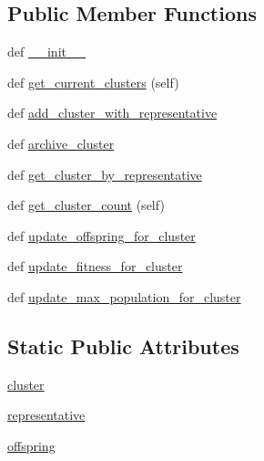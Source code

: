 \subsection*{Public Member Functions}
\begin{DoxyCompactItemize}
\item 
def \hyperlink{classNEAT__PyGenetics_1_1NEAT_1_1Repository_1_1ClusterRepository_1_1ClusterRepository_a49b3cd6db6131c52bba0de2481584f20}{\+\_\+\+\_\+init\+\_\+\+\_\+}
\item 
def \hyperlink{classNEAT__PyGenetics_1_1NEAT_1_1Repository_1_1ClusterRepository_1_1ClusterRepository_a06b7a0bc3b6bf0ddc6eb9040dcecd74b}{get\+\_\+current\+\_\+clusters} (self)
\item 
def \hyperlink{classNEAT__PyGenetics_1_1NEAT_1_1Repository_1_1ClusterRepository_1_1ClusterRepository_adab9f634071749a11cfe0875075fb0a5}{add\+\_\+cluster\+\_\+with\+\_\+representative}
\item 
def \hyperlink{classNEAT__PyGenetics_1_1NEAT_1_1Repository_1_1ClusterRepository_1_1ClusterRepository_a58649974b303a672e75c650e69d1cb21}{archive\+\_\+cluster}
\item 
def \hyperlink{classNEAT__PyGenetics_1_1NEAT_1_1Repository_1_1ClusterRepository_1_1ClusterRepository_af79b19639b87ae827067ddb4d23fe83d}{get\+\_\+cluster\+\_\+by\+\_\+representative}
\item 
def \hyperlink{classNEAT__PyGenetics_1_1NEAT_1_1Repository_1_1ClusterRepository_1_1ClusterRepository_aba5e54a8cf88aece8ebb990b812a3ce2}{get\+\_\+cluster\+\_\+count} (self)
\item 
def \hyperlink{classNEAT__PyGenetics_1_1NEAT_1_1Repository_1_1ClusterRepository_1_1ClusterRepository_a40254dd9f12511e8fa3e707b65938db4}{update\+\_\+offspring\+\_\+for\+\_\+cluster}
\item 
def \hyperlink{classNEAT__PyGenetics_1_1NEAT_1_1Repository_1_1ClusterRepository_1_1ClusterRepository_ac0949d637eb75abae63005db57f14700}{update\+\_\+fitness\+\_\+for\+\_\+cluster}
\item 
def \hyperlink{classNEAT__PyGenetics_1_1NEAT_1_1Repository_1_1ClusterRepository_1_1ClusterRepository_a69ed07f142ec57528a44026aba6bd1fe}{update\+\_\+max\+\_\+population\+\_\+for\+\_\+cluster}
\end{DoxyCompactItemize}
\subsection*{Static Public Attributes}
\begin{DoxyCompactItemize}
\item 
\hyperlink{classNEAT__PyGenetics_1_1NEAT_1_1Repository_1_1ClusterRepository_1_1ClusterRepository_a1834515cd9dbbdf31e311ce6a2e8e78a}{cluster}
\item 
\hyperlink{classNEAT__PyGenetics_1_1NEAT_1_1Repository_1_1ClusterRepository_1_1ClusterRepository_accef80a33d0dd0473ad8c9b3723ec0d9}{representative}
\item 
\hyperlink{classNEAT__PyGenetics_1_1NEAT_1_1Repository_1_1ClusterRepository_1_1ClusterRepository_a8d545f61188a41b15f2c7f3fb2fddcec}{offspring}
\end{DoxyCompactItemize}


